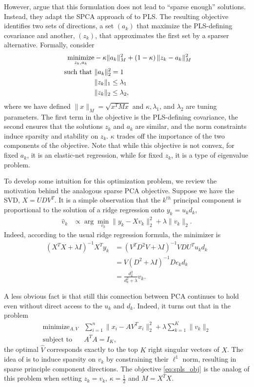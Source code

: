 \documentclass[14pt]{extarticle}
\begin{document}
However, \cite{chun2010sparse} argue that this formulation does not lead to
``sparse enough'' solutions. Instead, they adapt the SPCA approach of
\cite{zou2006sparse} to PLS. The resulting objective identifies two sets of
directions, a set $\left(a_k\right)$ that maximize the PLS-defining covariance
and another, $\left(z_k\right)$, that approximates the first set by a sparser
alternative. Formally, consider
\begin{align}
  \label{eq:spls_obj}
  \mathop\mathrm{minimize}_{z_k, a_k} &-\kappa \|a_k\|_M^2 + \left(1 - \kappa\right) \|z_k - a_k\|_M^2 \\
  \text{ such that } & \|a_k\|_2^2 = 1 \nonumber \\
  &\|z_k\|_1 \leq \lambda_1 \nonumber \\
  &\|z_k\|_2 \leq \lambda_2, \nonumber
\end{align}
where we have defined $\|x\|_M = \sqrt{x^T M x}$ and $\kappa, \lambda_1$, and
$\lambda_2$ are tuning parameters. The first term in the objective is the
PLS-defining covariance, the second ensures that the solutions $z_k$ and $a_k$
are similar, and the norm constraints induce sparsity and stability on $z_k$.
$\kappa$ trades off the importance of the two components of the objective. Note
that while this objective is not convex, for fixed $a_k$, it is an elastic-net
regression, while for fixed $z_k$, it is a type of eigenvalue problem.

To develop some intuition for this optimization problem, we review the
motivation behind the analogous sparse PCA objective. Suppose we have the SVD,
$X = UDV^T$. It is a simple observation that the $k^{th}$ principal component is
proportional to the solution of a ridge regression onto $y_k = u_k d_k$,
\begin{align*}
  \hat{v}_k &\propto \arg \min_{v_k} \|y_k - X v_k\|_2^2 + \lambda \|v_k \|_2.
\end{align*}
Indeed, according to the usual ridge regression formula, the minimizer is
\begin{align*}
  \left(X^TX + \lambda I\right)^{-1} X^T y_k &= \left(V^T D^2 V + \lambda I\right)^{-1} V D U^T u_k d_k \\
  &= V\left(D^2 + \lambda I\right)^{-1} D e_k d_k \\
  &= \frac{d_k^2}{d_k^2 + \lambda}v_k.
\end{align*}

A less obvious fact is that still this connection between PCA continues to hold
even without direct access to the $u_k$ and $d_k$. Indeed, it turns out that in
the problem
\begin{align}
  \label{eq:spca_obj_reform}
  \text{minimize}_{A, V} &\sum_{i = 1}^{n} \|x_i - AV^T x_i\|_2^2 +
  \lambda \sum_{k = 1}^{K} \|v_k\|_2 \\
  \text{subject to } &A^T A = I_K, \nonumber
\end{align}
the optimal $\hat{V}$ corresponds exactly to the top $K$ right singular vectors
of $X$. The idea of \cite{zou2006sparse} is to induce sparsity on $v_k$ by
constraining their $\ell^1$ norm, resulting in sparse principle component
directions. The objective \ref{eq:spls_obj} is the analog of this problem when
setting $z_k = v_k$, $\kappa = \frac{1}{2}$ and $M = X^T X$.
\end{document}
